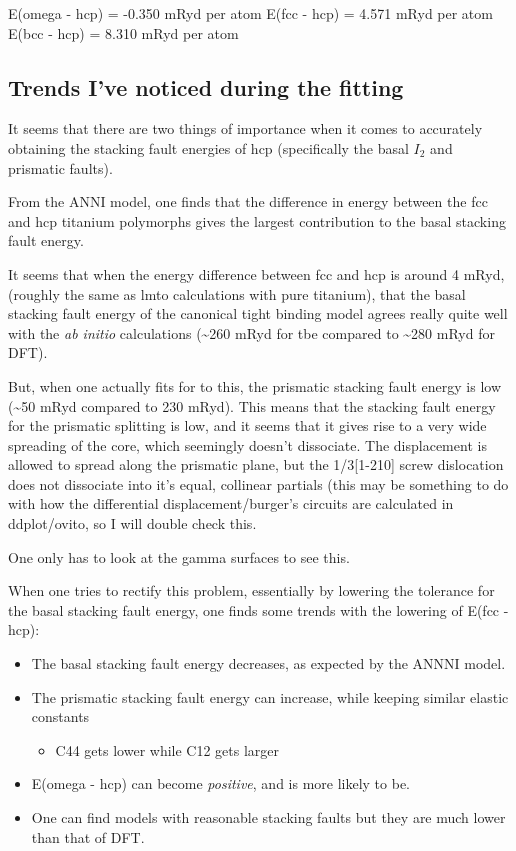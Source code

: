 \documentclass[11pt]{article}
\begin{document}
E(omega - hcp)  = -0.350 mRyd per atom
E(fcc - hcp)    =  4.571 mRyd per atom
E(bcc - hcp)    =  8.310 mRyd per atom




\subsection{Trends I've noticed during the fitting}
\label{sec:org2654b09}

It seems that there are two things of importance when it comes to accurately obtaining the stacking
fault energies of hcp (specifically the basal \(I_2\) and prismatic faults). 

From the ANNI model, one finds that the difference in energy between the fcc and hcp titanium
polymorphs gives the largest contribution to the basal stacking fault energy. 

It seems that when the energy difference between fcc and hcp is around 4 mRyd, (roughly the same as
lmto calculations with pure titanium), that the basal stacking fault energy of the canonical tight
binding model agrees really quite well with the \emph{ab initio} calculations (\textasciitilde{}260 mRyd for tbe compared
to \textasciitilde{}280 mRyd for DFT). 

But, when one actually fits for to this, the prismatic stacking fault energy is low (\textasciitilde{}50 mRyd
compared to 230 mRyd). This means that the stacking fault energy for the prismatic splitting is low,
and it seems that it gives rise to a very wide spreading of the core, which seemingly doesn't
dissociate. 
The displacement is allowed to spread along the prismatic plane, but the 1/3[1-210] screw
dislocation does not dissociate into it's equal, collinear partials (this may be something to do
with how the differential displacement/burger's circuits are calculated in ddplot/ovito, so I will
double check this.

One only has to look at the gamma surfaces to see this. 



When one tries to rectify this problem, essentially by lowering the tolerance for the basal stacking
fault energy, one finds some trends with the lowering of E(fcc - hcp):
\begin{itemize}
\item The basal stacking fault energy decreases, as expected by the ANNNI model.
\item The prismatic stacking fault energy can increase, while keeping similar elastic constants
\begin{itemize}
\item C44 gets lower while C12 gets larger
\end{itemize}
\item E(omega - hcp) can become \emph{positive}, and is more likely to be.
\item One can find models with reasonable stacking faults but they are much lower than that of DFT.
\end{itemize}
\end{document}
